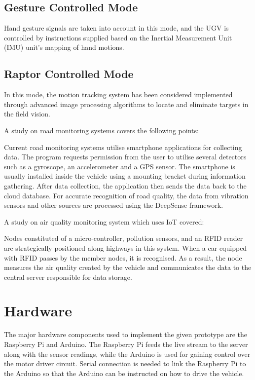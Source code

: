 \documentclass[conference,a4paper]{IEEEtran}
\begin{document}
\subsection{Gesture Controlled Mode}
Hand gesture signals are taken into account in this mode, and the UGV is controlled by instructions supplied based on the Inertial Measurement Unit (IMU) unit's mapping of hand motions.\cite{9}
\subsection{Raptor Controlled Mode}
In this mode, the motion tracking system has been considered implemented through advanced image processing algorithms to locate and eliminate targets in the field vision.


A study on road monitoring systems covers the following points\cite{2}:

Current road monitoring systems utilise smartphone applications for collecting data. The program requests permission from the user to utilise several detectors such as a gyroscope, an accelerometer and a GPS sensor. The smartphone is usually installed inside the vehicle using a mounting bracket during information gathering. After data collection, the application then sends the data back to the cloud database. For accurate recognition of road quality, the data from vibration sensors and other sources are processed using the DeepSense framework.

A study on air quality monitoring system which uses IoT covered\cite{3}:

Nodes constituted of a micro-controller, pollution sensors, and an RFID reader are strategically positioned along highways in this system. When a car equipped with RFID passes by the member nodes, it is recognised. As a result, the node measures the air quality created by the vehicle and communicates the data to the central server responsible for data storage.
\section{Hardware}
The major hardware components used to implement the given prototype are the Raspberry Pi and Arduino. The Raspberry Pi feeds the live stream to the server along with the sensor readings, while the Arduino is used for gaining control over the motor driver circuit. Serial connection is needed to link the Raspberry Pi to the Arduino so that the Arduino can be instructed on how to drive the vehicle.
\end{document}
